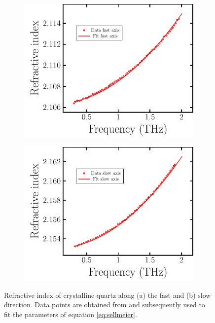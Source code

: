 \begin{figure}[H]
    \begin{subfigure}[b]{.5\linewidth}
    \caption{}\label{}
    \centering\includegraphics[scale=0.7]{images/appendix/plots/quartz_fits/ri_quartz_a.pdf}
    \end{subfigure}%
    \begin{subfigure}[b]{.5\linewidth}
    \caption{}\label{}
    \centering\includegraphics[scale=0.7]{images/appendix/plots/quartz_fits/ri_quartz_b.pdf}
    \end{subfigure}
    \caption{Refractive index of crystalline quartz along (a) the fast and (b) slow direction. Data points are obtained from \cite{DGrischkowsky1990} and subsequently used to fit the parameters of equation \ref{eq:sellmeier}.}
    \label{fig:ri_quartz}
\end{figure}

